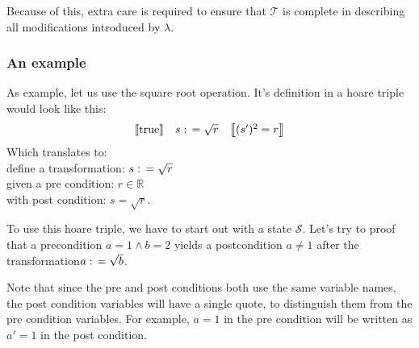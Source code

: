 \documentclass{article}
\newcommand{\hoaretrip}[3]{
	\ensuremath{
		\begin{array}{ccc}
			\state{#1} & #2 & \state{#3}
		\end{array}
	}
    }
\newcommand{\transformtext}{transformation}
\newcommand{\true}{\textrm{true}}
\newcommand{\state}[1]{\left\llbracket #1 \right\rrbracket}  %
\begin{document}
Because of this, extra care is required to ensure that $\mathcal{T}$
is complete in describing all modifications introduced by $\lambda$.


\subsubsection*{An example}
As example, let us use the square root operation.
It's definition in a hoare triple would look like this:
\begin{equation*}
\hoaretrip
    {\true}
    {s \becomes \sqrt{r}}
    {(s')^2 = r}
\end{equation*}
Which translates to:\\
define a \transformtext: $s \,\colon\!= \sqrt{r}$\\
given a pre condition: $r \in \mathbb{R}$\\
with post condition: $s = \sqrt{r}$.

To use this hoare triple, we have to start out with a state $\mathcal{S}$.
Let's try to proof that a precondition $a = 1 \land b = 2$
yields a postcondition $a \neq 1$
after the \transformtext $a \,\colon\!= \sqrt{b}$.

Note that since the pre and post conditions both use the same variable names,
the post condition variables will have a single quote,
to distinguish them from the pre condition variables.
For example, $a = 1$ in the pre condition will be written as $a' = 1$ in the
post condition.
\end{document}

